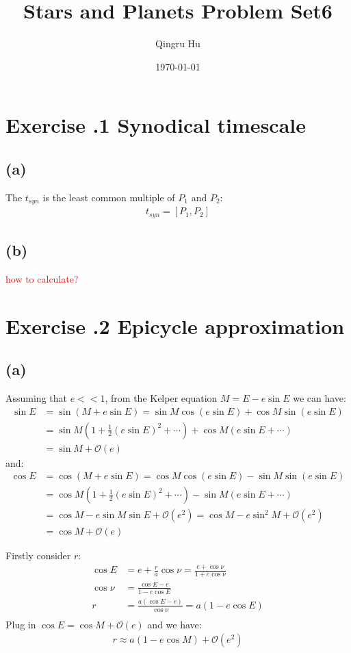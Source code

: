 \documentclass[a4paper,12pt]{article}
\title{\textbf{Stars and Planets Problem Set6}}
\author{Qingru Hu}
\date{\today}
\begin{document}
\maketitle
\section*{\textbf{Exercise \uppercase\expandafter{}.1 Synodical timescale}}
\subsection*{(a)}
The $t_{syn}$ is the least common multiple of $P_1$ and $P_2$:
\begin{align*}
    t_{syn} = [P_1, P_2]
\end{align*}

\subsection*{(b)}
\textcolor{red}{how to calculate?}


\section*{\textbf{Exercise \uppercase\expandafter{}.2 Epicycle approximation}}
\subsection*{(a)}
Assuming that $e<<1$, from the Kelper equation $M = E - e \sin E$ we can have:
\begin{align*}
    \sin E &= \sin(M + e\sin E) = \sin M \cos(e\sin E) + \cos M \sin(e\sin E) \\
           &= \sin M (1+\frac{1}{2}(e\sin E)^2 +\cdots) + \cos M (e\sin E + \cdots) \\
           &= \sin M + \mathcal{O} (e)
\end{align*}
and:
\begin{align*}
    \cos E &= \cos(M + e\sin E) = \cos M \cos(e\sin E) - \sin M \sin(e\sin E) \\
           &= \cos M (1+\frac{1}{2}(e\sin E)^2 +\cdots) - \sin M (e\sin E + \cdots) \\
           &= \cos M - e\sin M \sin E + \mathcal{O} (e^2) = \cos M - e\sin ^2M + \mathcal{O} (e^2)\\
           &= \cos M + \mathcal{O} (e)
\end{align*}

Firstly consider $r$:
\begin{align*}
    \cos E &= e + \frac{r}{a} \cos \nu = \frac{e + \cos \nu}{1 + e\cos \nu} \\
    \cos \nu &= \frac{\cos E - e}{1 - e\cos E} \\
    r &= \frac{a(\cos E - e)}{\cos \nu} = a (1 - e \cos E) \\
\end{align*}
Plug in $\cos E = \cos M + \mathcal{O} (e)$ and we have:
\begin{align*}
    r \approx  a (1 - e \cos M) + \mathcal{O} (e^2)
\end{align*}
\end{document}
